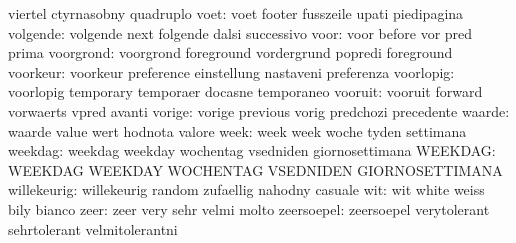                           viertel                   ctyrnasobny
                           quadruplo
                     voet: voet                      footer
                           fusszeile                 upati
                           piedipagina
                 volgende: volgende                  next
                           folgende                  dalsi
                           successivo
                     voor: voor                      before
                           vor                       pred
                           prima
                voorgrond: voorgrond                 foreground
                           vordergrund               popredi
                           foreground                %
                 voorkeur: voorkeur                  preference
                           einstellung               nastaveni
                           preferenza
                voorlopig: voorlopig                 temporary
                           temporaer                 docasne
                           temporaneo
                  vooruit: vooruit                   forward
                           vorwaerts                 vpred
                           avanti
                   vorige: vorige                    previous
                           vorig                     predchozi
                           precedente
                   waarde: waarde                    value
                           wert                      hodnota
                           valore
                     week: week                      week
                           woche                     tyden
                           settimana
                  weekdag: weekdag                   weekday
                           wochentag                 vsedniden
                           giornosettimana
                  WEEKDAG: WEEKDAG                   WEEKDAY
                           WOCHENTAG                 VSEDNIDEN
                           GIORNOSETTIMANA
              willekeurig: willekeurig               random
                           zufaellig                 nahodny
                           casuale
                      wit: wit                       white
                           weiss                     bily
                           bianco
                     zeer: zeer                      very
                           sehr                      velmi
                           molto
               zeersoepel: zeersoepel                verytolerant
                           sehrtolerant              velmitolerantni
